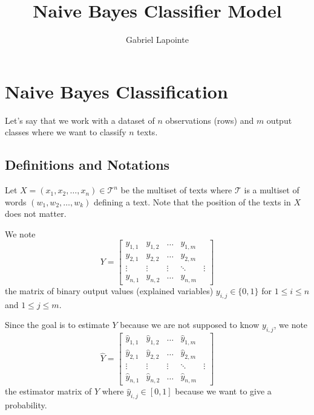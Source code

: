 \documentclass{article}
\title{Naive Bayes Classifier Model}
\author{Gabriel Lapointe}
\begin{document}
\section{Naive Bayes Classification}
Let's say that we work with a dataset of $n$ observations (rows) and $m$ output classes where we want to classify $n$ texts.

\subsection{Definitions and Notations}
Let $X = (x_1,x_2,\ldots,x_n) \in \mathcal{T}^n$ be the multiset of texts where $\mathcal{T}$ is a multiset of words $(w_1, w_2, \ldots, w_k)$ defining a text. Note that the position of the texts in $X$ does not matter.

We note 
\begin{equation} \label{eq:ExplainedVariableMatrix}
Y =\begin{bmatrix}
	    y_{1,1}      & y_{1,2}      & \ldots & y_{1,m} \\
	    y_{2,1} & y_{2,2} & \ldots & y_{2,m} \\
	    \vdots       & \vdots       & \vdots        & \ddots & \vdots \\
	    y_{n,1}  & y_{n,2}  & \ldots & y_{n,m}
	\end{bmatrix}
\end{equation}
the matrix of binary output values (explained variables) $y_{i,j} \in \{0,1\}$ for $1 \leq i \leq n$ and $1 \leq j \leq m$.

Since the goal is to estimate $Y$ because we are not supposed to know $y_{i,j}$, we note 
\begin{equation} \label{eq:EstimatorMatrix}
\widehat{Y} =\begin{bmatrix}
	    \widehat{y}_{1,1}      & \widehat{y}_{1,2}      & \ldots & \widehat{y}_{1,m} \\
	    \widehat{y}_{2,1} & \widehat{y}_{2,2} & \ldots & \widehat{y}_{2,m} \\
	    \vdots       & \vdots       & \vdots        & \ddots & \vdots \\
	    \widehat{y}_{n,1}  & \widehat{y}_{n,2}  & \ldots & \widehat{y}_{n,m}
	\end{bmatrix}
\end{equation}
the estimator matrix of $Y$ where $\widehat{y}_{i,j} \in [0,1]$ because we want to give a probability.
\end{document}
